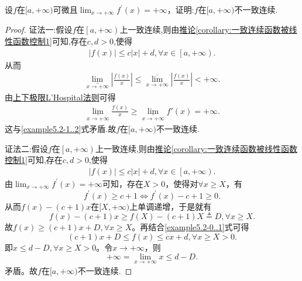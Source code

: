 \documentclass[../../main.tex]{subfiles}%
\begin{document}
\begin{proposition}[函数爆炸一定不一致连续]\label{proposition:函数爆炸一定不一致连续}
设\(f\)在\([a,+\infty)\)可微且\(\lim_{x\rightarrow +\infty}f^{\prime}(x)= +\infty\)，证明:\(f\)在\([a,+\infty)\)不一致连续.
\end{proposition}
\begin{proof}

{\color{blue}证法一:}假设$f$在$\left[ a,+\infty \right) $上一致连续,则由\hyperref[corollary:一致连续函数被线性函数控制1]{推论\ref{corollary:一致连续函数被线性函数控制1}}可知,存在$c,d>0$,使得
\begin{align}
\left| f\left( x \right) \right|\leqslant c\left| x \right|+d,\forall x\in \left[ a,+\infty \right) .\label{example5.2-1..1}
\end{align}
从而
\begin{align}\label{example5.2-1..2}
\underset{x\rightarrow +\infty}{\underline{\lim }}\left| \frac{f\left( x \right)}{x} \right|\leqslant \underset{x\rightarrow +\infty}{\overline{\lim }}\left| \frac{f\left( x \right)}{x} \right|<+\infty .
\end{align}
由\hyperref[theorem:上下极限L'Hospital法则]{上下极限L'Hospital法则}可得
\begin{align*}
\underset{x\rightarrow +\infty}{\underline{\lim }}\frac{f\left( x \right)}{x}\geqslant \underset{x\rightarrow +\infty}{\underline{\lim }}f'\left( x \right) =+\infty .
\end{align*}
这与\eqref{example5.2-1..2}式矛盾.故\(f\)在\([a,+\infty)\)不一致连续.

{\color{blue}证法二:}假设$f$在$\left[ a,+\infty \right) $上一致连续,则由\hyperref[corollary:一致连续函数被线性函数控制1]{推论\ref{corollary:一致连续函数被线性函数控制1}}可知,存在$c,d>0$,使得
\begin{align}
\left| f\left( x \right) \right|\leqslant c\left| x \right|+d,\forall x\in \left[ a,+\infty \right) .\label{example5.2-0..1}
\end{align}
由\(\lim_{x\rightarrow +\infty}f^\prime(x) = +\infty\)可知，存在\(X > 0\)，使得对\(\forall x\geqslant X\)，有
\[
f^\prime(x) \geqslant c + 1 \Leftrightarrow f^\prime(x) - c + 1 \geqslant 0.
\]
从而\(f(x) - (c + 1)x\)在\([X, +\infty)\)上单调递增，于是就有
\[
f(x) - (c + 1)x \geqslant f(X) - (c + 1)X \triangleq D, \forall x\geqslant X.
\]
故\(f(x) \geqslant (c + 1)x + D, \forall x\geqslant X\)。再结合\eqref{example5.2-0..1}式可得
\[
(c + 1)x + D \leqslant f(x) \leqslant cx + d, \forall x\geqslant X > 0.
\]
即\(x \leqslant d - D, \forall x\geqslant X > 0\)。令\(x\rightarrow +\infty\)，则
\[
+\infty = \lim_{x\rightarrow +\infty}x \leqslant d - D.
\]
矛盾。故\(f\)在\([a,+\infty)\)不一致连续.

\end{proof}
\end{document}
